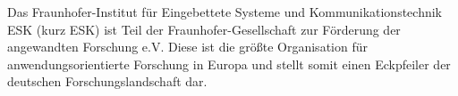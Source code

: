 \message{ !name(bericht.tex)}\documentclass[a4paper, 11pt, twoside]{scrartcl}
\begin{document}

Das Fraunhofer-Institut für Eingebettete Systeme und Kommunikationstechnik ESK (kurz ESK) ist Teil der Fraunhofer-Gesellschaft zur Förderung der angewandten Forschung e.V. 
Diese ist die größte Organisation für anwendungsorientierte Forschung in Europa und stellt somit einen Eckpfeiler der deutschen Forschungslandschaft dar. 


\end{document}
